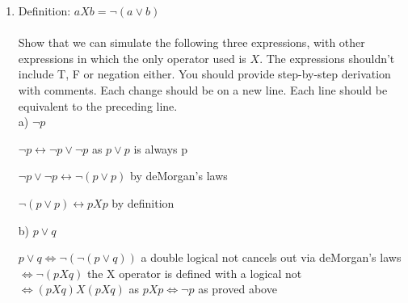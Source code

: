 \documentclass[12pt]{article}
\begin{document}
\begin{enumerate}
{\color{blue}
1. $\neg ( (\neg p \lor \neg q) \lor \neg (\neg q \land r) ) \rightarrow$ Demorgan's on $\neg (p\land q) $\\
2. $\neg ( (\neg p \lor \neg q) \lor  (q \lor \neg r) ) \rightarrow$ Demorgan's on $ \neg (\neg q \land r) $\\
3. $\neg ( \neg p \lor \neg q \lor  q \lor \neg r ) \rightarrow$ Associative Law \\
4. $p \land q \land  \neg q \land r \rightarrow $ Demorgan's on outer parenthesis \\
5. $p \land F \land r \rightarrow$ $q \land  \neg q$ annihilates to F \\
6. $F \rightarrow$ $p \land F \land r$ is always F \\
}

\newpage


\item       %
%
%
Definition:    $a X b = \neg ( a \lor  b)$\\\\
Show that we can simulate the following three expressions, with other expressions in which the only operator used is $X$. The expressions shouldn't include T, F or negation either.  You should provide step-by-step derivation with comments. Each change should be on a new line. Each line should be equivalent to the preceding line. \\
a) $\neg p$ \\

{\color{blue}

$\neg p \leftrightarrow \neg p \lor \neg p$ as $p\lor p$ is always p

$\neg p \lor \neg p \leftrightarrow \neg (p\lor p)$ by deMorgan's laws

$\neg(p\lor p)\leftrightarrow pXp$ by definition

}

\vskip1cm

b) $p\lor q$ \\

{\color{blue}
  $p\lor q \iff \neg (\neg (p\lor q))$ a double logical not cancels out via deMorgan's laws\\ 
  $\iff \neg(pXq)$ the X operator is defined with a logical not \\ 
  $\iff (pXq)X(pXq)$ as $pXp \iff \neg p$ as proved above

}


\end{enumerate}
\end{document}

